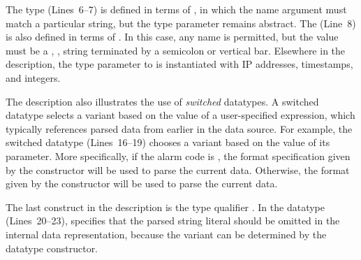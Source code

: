 The  type (Lines~6--7) is defined in terms of , in
which the name argument must match a particular string, but the type
parameter remains abstract.  The  (Line~8) is also defined
in terms of .  In this case, any name is permitted, but the
value must be a , \ie{}, string terminated by a semicolon
or vertical bar.  Elsewhere in the description, the type parameter to
 is instantiated with IP addresses, timestamps, and integers.


The \darkstar{} description also illustrates the use of
\textit{switched} datatypes.  A switched datatype selects a variant
based on the value of a user-specified \ocaml{} expression, which
typically references parsed data from earlier in the data source.  For
example, the switched datatype  (Lines~16--19) chooses a
variant based on the value of its  parameter.  More
specifically, if the alarm code is , the format specification
given by the  constructor will be used to parse the
current data.  Otherwise, the format given by the 
constructor will be used to parse the current data.

The last construct in the \darkstar{} description is the type
qualifier .  In the  datatype (Lines~20--23),
 specifies that the parsed string literal should be omitted
in the internal data representation, because the variant can be
determined by the datatype constructor.


